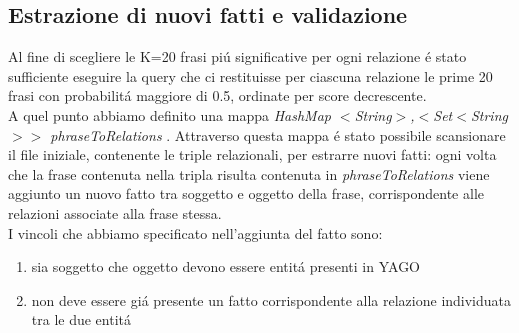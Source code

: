 \documentclass[twocolumn,10pt]{asme2ej}
\begin{document}
\subsection{Estrazione di nuovi fatti e validazione}
Al fine di scegliere le K=20 frasi pi\'u significative per ogni relazione \'e stato sufficiente eseguire la query che ci restituisse per ciascuna relazione le prime 20 frasi con probabilit\'a maggiore di 0.5, ordinate per score decrescente.\\ A quel punto abbiamo definito una mappa \textit{HashMap $<$String$>$,$<$Set$<$String$>>$ phraseToRelations }.
Attraverso questa mappa \'e stato possibile scansionare il file iniziale, contenente le triple relazionali, per estrarre nuovi fatti: ogni volta che la frase contenuta nella tripla risulta contenuta in \textit{phraseToRelations} viene aggiunto un nuovo fatto tra soggetto e oggetto della frase, corrispondente  alle relazioni associate alla frase stessa.\\ I vincoli che abbiamo specificato nell'aggiunta del fatto sono:
\begin{enumerate}
\item sia soggetto che oggetto devono essere entit\'a presenti in YAGO
\item non deve essere gi\'a presente un fatto corrispondente alla relazione individuata tra le due entit\'a 
\end{enumerate}
\end{document}

